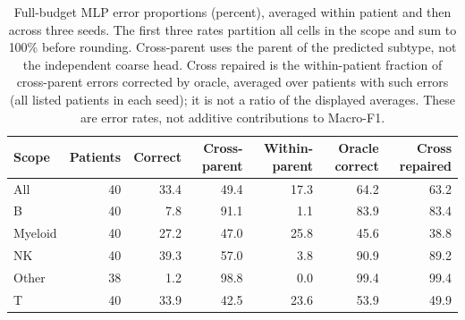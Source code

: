 \begin{table}[H]
\centering\small
\setlength{\tabcolsep}{4pt}
\begin{tabular}{lrrrrrr}
\toprule
Scope & Patients & Correct & Cross-parent & Within-parent & Oracle correct & Cross repaired \\
\midrule
All & 40 & 33.4 & 49.4 & 17.3 & 64.2 & 63.2 \\
B & 40 & 7.8 & 91.1 & 1.1 & 83.9 & 83.4 \\
Myeloid & 40 & 27.2 & 47.0 & 25.8 & 45.6 & 38.8 \\
NK & 40 & 39.3 & 57.0 & 3.8 & 90.9 & 89.2 \\
Other & 38 & 1.2 & 98.8 & 0.0 & 99.4 & 99.4 \\
T & 40 & 33.9 & 42.5 & 23.6 & 53.9 & 49.9 \\
\bottomrule
\end{tabular}
\caption{Full-budget MLP error proportions (percent), averaged within patient and then across three seeds. The first three rates partition all cells in the scope and sum to 100\% before rounding. Cross-parent uses the parent of the predicted subtype, not the independent coarse head. Cross repaired is the within-patient fraction of cross-parent errors corrected by oracle, averaged over patients with such errors (all listed patients in each seed); it is not a ratio of the displayed averages. These are error rates, not additive contributions to Macro-F1.}
\label{tab:mlp_error_partition}
\end{table}
